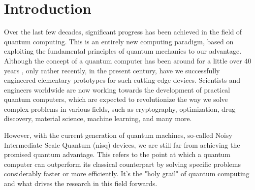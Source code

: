 \raggedbottom

\chapter{Introduction}
\label{chapter:introduction}



Over the last few decades, significant progress has been achieved in the field of quantum computing. This is an entirely new computing paradigm, based on exploiting the fundamental principles of quantum mechanics to our advantage. Although the concept of a quantum computer has been around for a little over 40 years \cite{preskill2023quantum}, only rather recently, in the present century, have we successfully engineered elementary prototypes for such cutting-edge devices. Scientists and engineers worldwide are now working towards the development of practical quantum computers, which are expected to revolutionize the way we solve complex problems in various fields, such as cryptography, optimization, drug discovery, material science, machine learning, and many more.

However, with the current generation of quantum machines, so-called Noisy Intermediate Scale Quantum (\acrshort{nisq}) devices, we are still far from achieving the promised quantum advantage. This refers to the point at which a quantum computer can outperform its classical counterpart by solving specific problems considerably faster or more efficiently. It's the "holy grail" of quantum computing and what drives the research in this field forwards.


